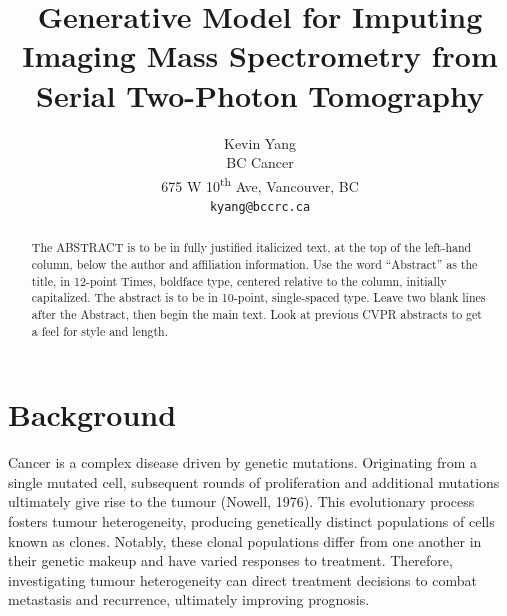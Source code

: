 \documentclass[10pt,twocolumn,letterpaper]{article}
\begin{document}
\title{Generative Model for Imputing Imaging Mass Spectrometry from Serial Two-Photon Tomography}

\author{Kevin Yang\\
BC Cancer\\
675 W 10\textsuperscript{th} Ave, Vancouver, BC\\
{\tt\small kyang@bccrc.ca}
}
\maketitle

\begin{abstract}
   The ABSTRACT is to be in fully justified italicized text, at the top of the left-hand column, below the author and affiliation information.
   Use the word ``Abstract'' as the title, in 12-point Times, boldface type, centered relative to the column, initially capitalized.
   The abstract is to be in 10-point, single-spaced type.
   Leave two blank lines after the Abstract, then begin the main text.
   Look at previous CVPR abstracts to get a feel for style and length.
\end{abstract}

\section{Background}
\label{sec:background}

Cancer is a complex disease driven by genetic mutations. Originating from a single mutated cell, subsequent rounds of proliferation and additional mutations ultimately give rise to the tumour (Nowell, 1976). This evolutionary process fosters tumour heterogeneity, producing genetically distinct populations of cells known as clones. Notably, these clonal populations differ from one another in their genetic makeup and have varied responses to treatment. Therefore, investigating tumour heterogeneity can direct treatment decisions to combat metastasis and recurrence, ultimately improving prognosis.
\end{document}
